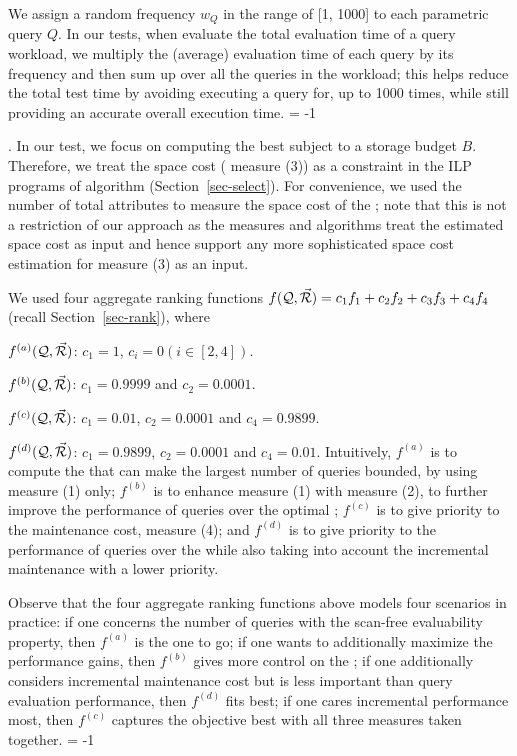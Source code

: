 {We assign a random frequency $w_{Q}$ in the range of [1, 1000] to each
parametric query $Q$. In our tests, when evaluate the total
evaluation time of a query workload, we multiply the (average)
evaluation time of each query by its frequency and then sum up
over all the queries in the workload; this helps reduce the total
test time by avoiding executing a query for, \eg up to 1000
times, while still providing an accurate overall execution time.
\looseness = -1


.
In our test, we focus on computing the best \bdss subject to a
storage budget $B$. Therefore, we treat the space cost (\ie
measure (3)) as a constraint in the ILP programs of algorithm
\opts (Section~\ref{sec-select}). For convenience, we used the
number of total attributes to measure the space cost of the
\bdss; note that this is not a restriction of our approach as the
measures and algorithms treat the estimated space cost as input
and hence support any more sophisticated space cost estimation
for measure (3) as an input.


We used four aggregate ranking functions $f(\mathcal Q, \vec{{\mathcal R}}) = c_{1}f_{1} +
c_{2}f_{2} + c_{3}f_{3} + c_{4}f_{4}$ (recall
Section~\ref{sec-rank}), where 
\bi
\item[(a)] $f^{(a)}(\mathcal Q, \vec{{\mathcal R}})$: $c_{1} = 1$, $c_{i} = 0(i\in [2,4])$.
\item[(b)] $f^{(b)}(\mathcal Q, \vec{{\mathcal R}})$: $c_{1} = 0.9999$ and $c_{2} = 0.0001$. 
\item[(c)] $f^{(c)}(\mathcal Q, \vec{{\mathcal R}})$: $c_{1} = 0.01$, $c_{2} = 0.0001$ and $c_{4}
  = 0.9899$. 
\item[(d)] $f^{(d)}(\mathcal Q, \vec{{\mathcal R}})$: $c_{1} = 0.9899$, $c_{2} =
  0.0001$ and $c_{4} = 0.01$.
\ei
Intuitively, $f^{(a)}$ is to compute the \bdss that can make the
largest number of queries bounded, by using measure (1) only; 
$f^{(b)}$ is to enhance measure (1) with measure (2), to further
improve the performance of queries over the optimal \bdss;
$f^{(c)}$ is to give priority to the maintenance cost, \ie
measure (4); and $f^{(d)}$ is to give priority to the performance
of queries over the \bdss while also taking into account the
incremental maintenance with a lower priority.

Observe that the four aggregate ranking functions above models
four scenarios in practice: if one concerns the number of queries
with the scan-free evaluability property, then $f^{(a)}$ is the
one to go; if one wants to additionally maximize the performance
gains, then $f^{(b)}$ gives more control on the \bdss; if one
additionally considers incremental maintenance cost but is less
important than query evaluation performance, then $f^{(d)}$ fits
best; if one cares incremental performance most, then $f^{(c)}$
captures the objective best with all three measures taken
together.
\looseness = -1


}

